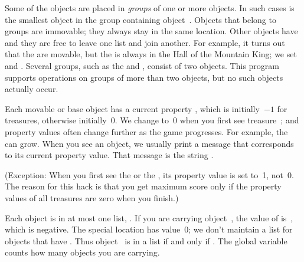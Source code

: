 Some of the objects are placed in {\it groups\/} of one or more objects.
In such cases  is the smallest object in the group containing
object~. Objects that belong to groups are immovable; they always
stay in the same location. Other objects have 
and they
are free to leave one list and join another. For example, it turns
out that the  are movable, but the  is always in the
Hall of the Mountain King; we set  and %
.
Several groups, such as the  and , consist of two
objects.
This program supports operations on groups of more than two objects,
but no such objects actually occur.

Each movable or base object  has a current property ,
which is initially~$-1$ for treasures, otherwise initially~0.
We change  to~0 when you first
see treasure~; and property values often change further as the game
progresses. For example, the  can grow. When you see an object,
we usually print a message that corresponds to its current property value.
That message is the string .

(Exception: When you first see the  or the , its
property
value is set to~1, not~0. The reason for this hack is that you get
maximum score only if the property values of all treasures are
zero when you finish.)

Each object is in at most one list, .
If you are carrying object~, the value of  is~,
which is negative.
The special location  has value~0;
we don't maintain a list  for objects that have
. Thus object~ is in a list if and only
if .
The global variable  counts how many objects you are carrying.

